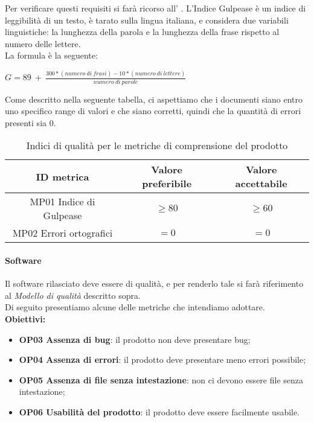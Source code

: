 \documentclass[../piano_di_qualifica.tex]{subfiles}
\begin{document}
Per verificare questi requisiti si farà ricorso all’ . L'Indice Gulpease è un indice di leggibilità di un testo, è tarato sulla lingua italiana, e considera due variabili linguistiche: la lunghezza della parola e la lunghezza della frase rispetto al numero delle lettere.\\
La formula è la seguente:\par
\begin{center}
	$G = 89\ +\ \frac{300 * (numero\ di\ frasi) - 10 * (numero\ di\ lettere)}{numero\ di\ parole} $
\end{center}
Come descritto nella seguente tabella, ci aspettiamo che i documenti siano entro uno specifico range di valori e che siano corretti, quindi che la quantità di errori presenti sia 0. \par

\begin{table}[!ht]
	\centering
	\begin{tabular}{|c|c|c|}
		\hline
		\rowcolor{lightgray}
		\textbf{ID metrica}      & \textbf{Valore preferibile} & \textbf{Valore accettabile} \\
		\hline
		MP01 Indice di Gulpease & \(\ge 80\)                  & \(\ge 60\)                  \\
		MP02 Errori ortografici & \(= 0\)                     & \(= 0\)                     \\
		\hline
	\end{tabular}
	\caption{Indici di qualità per le metriche di comprensione del prodotto}
\end{table}

\paragraph{Software}
Il software rilasciato deve essere di qualità, e per renderlo tale si farà riferimento al \emph{Modello di qualità} descritto sopra. \\
Di seguito presentiamo alcune delle metriche che intendiamo adottare. \\

\smallbreak
\textbf{Obiettivi:}
\smallbreak
\begin{itemize}
	\item \textbf{OP03 Assenza di bug}: il prodotto non deve presentare bug;
	\item \textbf{OP04 Assenza di errori}: il prodotto deve presentare meno errori possibile;
	\item \textbf{OP05 Assenza di file senza intestazione}: non ci devono essere file senza intestazione;
	\item \textbf{OP06 Usabilità del prodotto}: il prodotto deve essere facilmente usabile.
\end{itemize}
\end{document}
